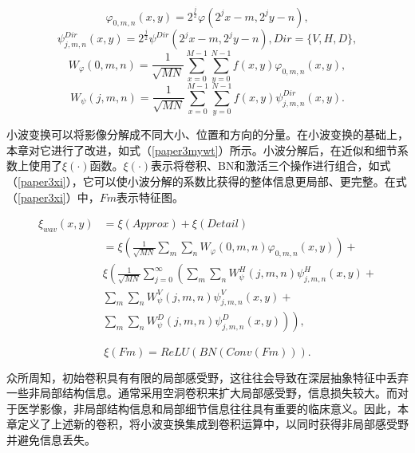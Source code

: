 \begin{equation}\label{paper3chidu}
\varphi_{0, m, n}(x, y)=2^{\frac{j}{2}} \varphi\left(2^{j} x-m, 2^{j} y-n\right),
\end{equation}
\begin{equation}\label{paper3xiaobomu}
\psi_{j, m, n}^{Dir}(x, y)=2^{\frac{j}{2}} \psi^{Dir}\left(2^{j} x-m, 2^{j} y-n\right), Dir=\{V, H, D\},
\end{equation}
\begin{equation}\label{paper3lf}
W_{\varphi}(0, m, n)=\frac{1}{\sqrt{M N}} \sum_{x=0}^{M-1} \sum_{y=0}^{N-1} f(x, y) \varphi_{0, m, n}(x, y),
\end{equation}
\begin{equation}\label{paper3hf}
W_{\psi}\left(j, m, n\right)=\frac{1}{\sqrt{M N}} \sum_{x=0}^{M-1} \sum_{y=0}^{N-1} f(x, y) \psi_{j, m, n}^{Dir}(x, y).
\end{equation}

小波变换可以将影像分解成不同大小、位置和方向的分量。在小波变换的基础上，本章对它进行了改进，如式（\ref{paper3mywt}）所示。小波分解后，在近似和细节系数上使用了$\xi(\cdot)$函数。$\xi(\cdot)$表示将卷积、BN和激活三个操作进行组合，如式（\ref{paper3xi}），它可以使小波分解的系数比获得的整体信息更局部、更完整。在式（\ref{paper3xi}）中，$Fm$表示特征图。

\begin{equation}\label{paper3mywt}
\begin{aligned}
\xi_{wav}(x, y) &=\xi(Approx)+\xi(Detail) \\
&=\xi\left(\frac{1}{\sqrt{M N}} \sum_{m} \sum_{n} W_{\varphi}(0, m, n) \varphi_{0, m, n}(x, y)\right)+\\
& \xi\left(\frac { 1 } { \sqrt { M N } } \sum _ { j = 0 } ^ { \infty } \left(\sum_{m} \sum_{n} W_{\psi}^{H}(j, m, n) \psi_{j, m, n}^{H}(x, y)+\right.\right.\\
& \sum_{m} \sum_{n} W_{\psi}^{V}(j, m, n) \psi_{j, m, n}^{V}(x, y)+\\
&\left.\left.\sum_{m} \sum_{n} W_{\psi}^{D}(j, m, n) \psi_{j, m, n}^{D}(x, y)\right)\right),
\end{aligned}
\end{equation}

\begin{equation}\label{paper3xi}
\xi(Fm)=ReLU(BN(Conv(Fm))).
\end{equation}

众所周知，初始卷积具有有限的局部感受野，这往往会导致在深层抽象特征中丢弃一些非局部结构信息。通常采用空洞卷积来扩大局部感受野，信息损失较大。而对于医学影像，非局部结构信息和局部细节信息往往具有重要的临床意义。因此，本章定义了上述新的卷积，将小波变换集成到卷积运算中，以同时获得非局部感受野并避免信息丢失。

